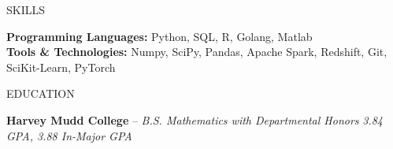\documentclass{resume} %
\begin{document}

\begin{rSection}{SKILLS}

\textbf{Programming Languages:} Python, SQL, R, Golang, Matlab\\[0em]
\textbf{Tools \& Technologies:} Numpy, SciPy, Pandas, Apache Spark, Redshift, Git, SciKit-Learn, PyTorch

\end{rSection}


\begin{rSection}{EDUCATION}

{{\bf Harvey Mudd College} -- {\it B.S. Mathematics with Departmental Honors}} \hfill {\em 3.84 GPA, 3.88 In-Major GPA}\\[-1.75em]

\end{rSection}
\end{document}
